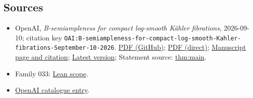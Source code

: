 \documentclass[11pt]{article}
\begin{document}
\subsection{Sources}
\begin{itemize}
\item OpenAI, \emph{B-semiampleness for compact log-smooth Kähler fibrations}, 2026-09-10; citation key \texttt{OAI:B-semiampleness-for-compact-log-smooth-Kahler-fibrations-September-10-2026}. \href{https://github.com/openai/math/blob/adc7f1241b42e322a6451854ab7e4b4c146bf78a/preprints/B-semiampleness-for-compact-log-smooth-Kahler-fibrations-September-10-2026/paper.pdf}{PDF (GitHub)}; \href{https://github.com/openai/math/raw/adc7f1241b42e322a6451854ab7e4b4c146bf78a/preprints/B-semiampleness-for-compact-log-smooth-Kahler-fibrations-September-10-2026/paper.pdf}{PDF (direct)}; \href{https://github.com/openai/math/blob/adc7f1241b42e322a6451854ab7e4b4c146bf78a/preprints/B-semiampleness-for-compact-log-smooth-Kahler-fibrations-September-10-2026/README.md}{Manuscript page and citation}; \href{https://github.com/openai/math/blob/main/preprints/B-semiampleness-for-compact-log-smooth-Kahler-fibrations-September-10-2026/paper.pdf}{Latest version}; Statement source: \href{https://github.com/openai/math/blob/adc7f1241b42e322a6451854ab7e4b4c146bf78a/preprints/B-semiampleness-for-compact-log-smooth-Kahler-fibrations-September-10-2026/build/sections/introduction.tex\#L83}{thm:main}.
\item Family 033: \href{https://github.com/openai/math/blob/adc7f1241b42e322a6451854ab7e4b4c146bf78a/lean/docs/033.md}{Lean scope}.
\item \href{https://github.com/openai/math/blob/adc7f1241b42e322a6451854ab7e4b4c146bf78a/CONTENTS.md}{OpenAI catalogue entry}.
\end{itemize}
\end{document}
